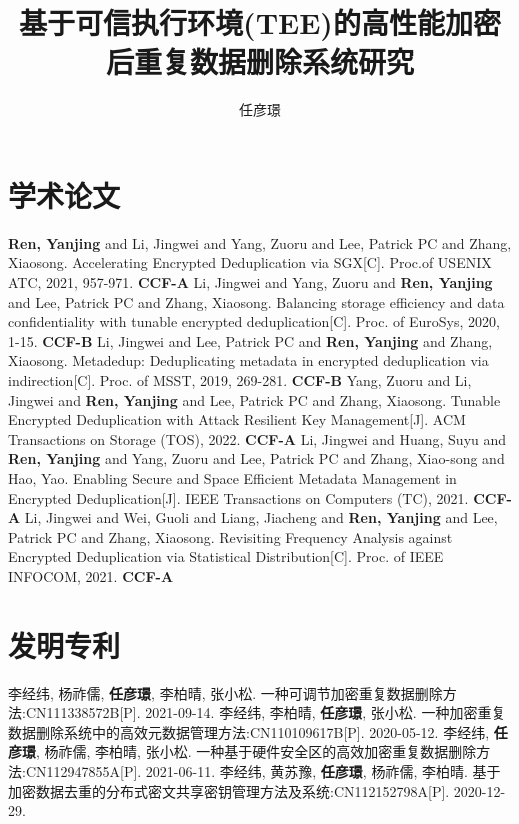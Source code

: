 \documentclass[master]{thesis-uestc}
\title{基于可信执行环境(TEE)的高性能加密后重复数据删除系统研究}{High-Performance Encrypted Data Deduplication System Based on TEE}
\author{任彦璟}{Ren Yanjing}
\begin{document}



\thesistableofcontents







% 

\thesisappendix



\begin{thesistheaccomplish}
    \section{学术论文}
     \textbf{Ren, Yanjing} and Li, Jingwei and Yang, Zuoru and Lee, Patrick PC and Zhang, Xiaosong. Accelerating Encrypted Deduplication via SGX[C]. Proc.of USENIX ATC, 2021, 957-971. \textbf{CCF-A}
     Li, Jingwei and Yang, Zuoru and \textbf{Ren, Yanjing} and Lee, Patrick PC and Zhang, Xiaosong. Balancing storage efficiency and data confidentiality with tunable encrypted deduplication[C]. Proc. of EuroSys, 2020, 1-15. \textbf{CCF-B}
     Li, Jingwei and Lee, Patrick PC and \textbf{Ren, Yanjing} and Zhang, Xiaosong. Metadedup: Deduplicating metadata in encrypted deduplication via indirection[C]. Proc. of MSST, 2019, 269-281. \textbf{CCF-B}
     Yang, Zuoru and Li, Jingwei and \textbf{Ren, Yanjing} and Lee, Patrick PC and Zhang, Xiaosong. Tunable Encrypted Deduplication with Attack Resilient Key Management[J]. ACM Transactions on Storage (TOS), 2022. \textbf{CCF-A}
     Li, Jingwei and Huang, Suyu and \textbf{Ren, Yanjing} and Yang, Zuoru and Lee, Patrick PC and Zhang, Xiao-song and Hao, Yao. Enabling Secure and Space Efficient Metadata Management in Encrypted Deduplication[J]. IEEE Transactions on Computers (TC), 2021. \textbf{CCF-A}
     Li, Jingwei and Wei, Guoli and Liang, Jiacheng and \textbf{Ren, Yanjing} and Lee, Patrick PC and Zhang, Xiaosong. Revisiting Frequency Analysis against Encrypted Deduplication via Statistical Distribution[C]. Proc. of IEEE INFOCOM, 2021. \textbf{CCF-A}
    \section{发明专利}
     李经纬, 杨祚儒, \textbf{任彦璟}, 李柏晴, 张小松. 一种可调节加密重复数据删除方法:CN111338572B[P]. 2021-09-14.
     李经纬, 李柏晴, \textbf{任彦璟}, 张小松. 一种加密重复数据删除系统中的高效元数据管理方法:CN110109617B[P]. 2020-05-12.
     李经纬, \textbf{任彦璟}, 杨祚儒, 李柏晴, 张小松. 一种基于硬件安全区的高效加密重复数据删除方法:CN112947855A[P]. 2021-06-11.
     李经纬, 黄苏豫, \textbf{任彦璟}, 杨祚儒, 李柏晴. 基于加密数据去重的分布式密文共享密钥管理方法及系统:CN112152798A[P]. 2020-12-29.
\end{thesistheaccomplish}
\end{document}
